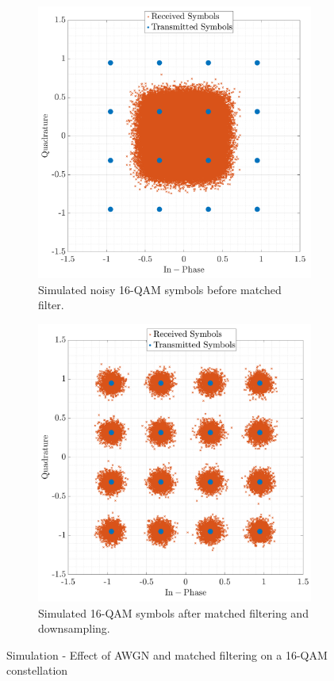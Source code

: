 \begin{figure}[H]
    \centering
    \begin{subfigure}{0.48\textwidth}
        \includegraphics[width=\linewidth]{Images/const-noisy.png}
        \caption{Simulated noisy 16-QAM symbols before matched filter.}
        \label{fig:const-noisy_cont}
    \end{subfigure}\hfill
    \begin{subfigure}{0.48\textwidth}
        \includegraphics[width=\linewidth]{Images/const-filtered-down.png} 
        \caption{Simulated 16-QAM symbols after matched filtering and downsampling.}
        \label{fig:const-filtered-down_cont}
    \end{subfigure}
    \caption{Simulation - Effect of AWGN and matched filtering on a 16-QAM constellation}
    \label{fig:constellations-noise_cont}
\end{figure}
